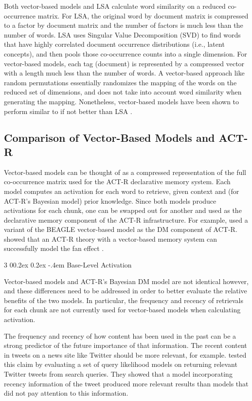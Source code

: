 \documentclass[man,floatsintext,donotrepeattitle]{apa6}
\makeatletter
\renewcommand{\subsubsection}{%
  \@startsection
  {subsubsection}%
  {3}%
  {\parindent}%
  {0\baselineskip \@plus 0.2ex \@minus 0.2ex}%
  {-.4em}%
  {\normalfont\normalsize\bfseries\addperi}}
\makeatother
\begin{document}
Both vector-based models and LSA calculate word similarity on a reduced co-occurrence matrix.
For LSA, the original word by document matrix is compressed to a factor by document matrix and the number of factors is much less than the number of words.
LSA uses Singular Value Decomposition (SVD) to find words that have highly correlated document occurrence distributions (i.e., latent concepts), and then pools those co-occurrence counts into a single dimension.
For vector-based models, each tag (document) is represented by a compressed vector with a length much less than the number of words.
A vector-based approach like random permutations essentially randomizes the mapping of the words on the reduced set of dimensions, and does not take into account word similarity when generating the mapping.
Nonetheless, vector-based models have been shown to perform similar to if not better than LSA \parencites{Sahlgren2008,Jones2007}.

\subsection{Comparison of Vector-Based Models and ACT-R}

Vector-based models can be thought of as a compressed representation of the full co-occurrence matrix used for the ACT-R declarative memory system.
Each model computes an activation for each word to retrieve, given context and (for ACT-R's Bayesian model) prior knowledge.
Since both models produce activations for each chunk, one can be swapped out for another and used as the declarative memory component of the ACT-R infrastructure.
For example, \textcite{Rutledge2007} used a variant of the BEAGLE vector-based model as the DM component of ACT-R.
\citeauthor{Rutledge2008} showed that an ACT-R theory with a vector-based memory system can successfully model the fan effect \parencite{Anderson1974}.

\subsubsection{Base-Level Activation}

Vector-based models and ACT-R's Bayesian DM model are not identical however, and these differences need to be addressed in order to better evaluate the relative benefits of the two models. 
In particular, the frequency and recency of retrievals for each chunk are not currently used for vector-based models when calculating activation.

The frequency and recency of how content has been used in the past can be a strong predictor of the future importance of that information. 
The recent content in tweets on a news site like Twitter should be more relevant, for example.
\textcite{Efron2011} tested this claim by evaluating a set of query likelihood models on returning relevant Twitter tweets from search queries.
They showed that a model incorporating recency information of the tweet produced more relevant results than models that did not pay attention to this information.
\end{document}
